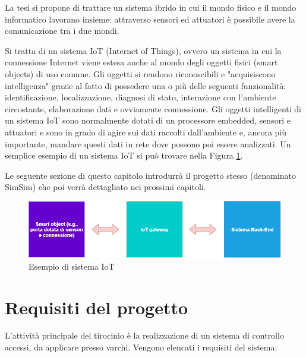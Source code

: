 \documentclass[12pt]{report}
\begin{document}
La tesi si propone di trattare un sistema ibrido in cui il mondo fisico e il mondo informatico lavorano insieme: attraverso sensori ed attuatori è possibile avere la comunicazione tra i due mondi. 

Si tratta di un sistema IoT (Internet of Things), ovvero un sistema in cui la connessione Internet viene estesa anche al mondo degli oggetti fisici (smart objects\cite{smart_objects}) di uso comune. Gli oggetti si rendono riconoscibili e "acquisiscono intelligenza" grazie al fatto di possedere una o più delle seguenti funzionalità: identificazione, localizzazione, diagnosi di stato, interazione con l'ambiente circostante, elaborazione dati e ovviamente connessione.
Gli oggetti intelligenti di un sistema IoT sono normalmente dotati di un processore embedded, sensori e attuatori e sono in grado di agire sui dati raccolti dall'ambiente e, ancora più importante, mandare questi dati in rete dove possono poi essere analizzati\cite{IoT}. Un semplice esempio di un sistema IoT si può trovare nella Figura \ref{fig:iot_diagram}.

Le seguente sezione di questo capitolo introdurrà il progetto stesso (denominato SimSim) che poi verrà dettagliato nei prossimi capitoli.

\begin{figure}
	\includegraphics[width=\linewidth]{./img/iot_diagram.png}
	\caption{Esempio di sistema IoT}
	\label{fig:iot_diagram}
\end{figure}


%
\section{Requisiti del progetto}\label{sec:req}
%

L'attività principale del tirocinio è la realizzazione di un sistema di controllo accessi, da applicare presso varchi. Vengono elencati i requisiti del sistema:
\end{document}

